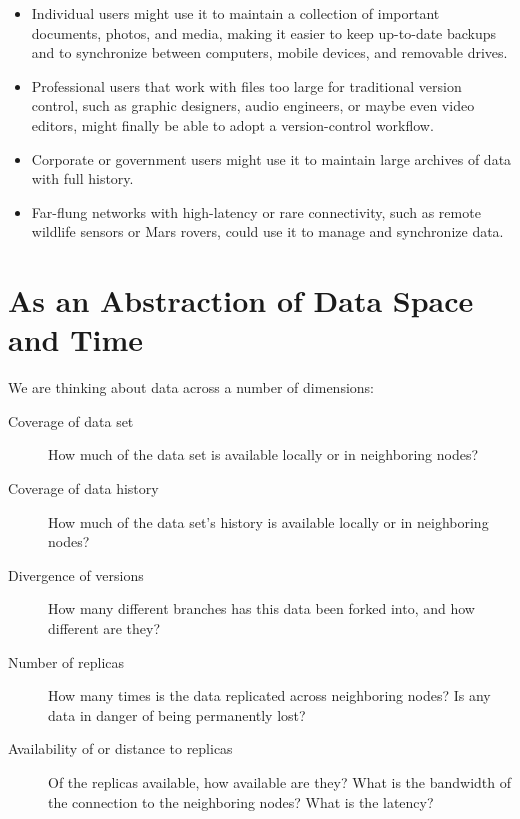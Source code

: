 \begin{itemize}

  \item Individual users might use it to maintain a collection of important
    documents, photos, and media, making it easier to keep up-to-date backups
    and to synchronize between computers, mobile devices, and removable drives.

  \item Professional users that work with files too large for traditional
    version control, such as graphic designers, audio engineers, or maybe even
    video editors, might finally be able to adopt a version-control workflow.

  \item Corporate or government users might use it to maintain large archives of
    data with full history.

  \item Far-flung networks with high-latency or rare connectivity, such as
    remote wildlife sensors or Mars rovers, could use it to manage and
    synchronize data.

\end{itemize}



\section{As an Abstraction of Data Space and Time}

We are thinking about data across a number of dimensions:

\begin{description}

  \item[Coverage of data set] How much of the data set is available locally or
    in neighboring nodes?

  \item[Coverage of data history] How much of the data set's history is
    available locally or in neighboring nodes?

  \item[Divergence of versions] How many different branches has this data been
    forked into, and how different are they?

  \item[Number of replicas] How many times is the data replicated across
    neighboring nodes? Is any data in danger of being permanently lost?

  \item[Availability of or distance to replicas] Of the replicas available, how
    available are they? What is the bandwidth of the connection to the
    neighboring nodes? What is the latency?

\end{description}



